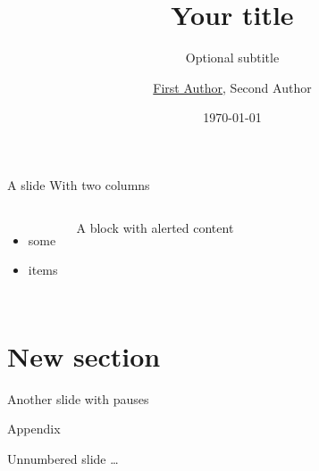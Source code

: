 \documentclass[aspectratio=169]{beamer} %
\title{Your title}
\subtitle{Optional subtitle}
\author{\underline{First Author}, Second Author}
\date{\today}
\institute{Affiliations}
\begin{document}
{\maketitle}

\begin{frame}{A slide}
  With two columns

  \begin{columns}
    \begin{itemize}
      \item some
      \item items
    \end{itemize}

    \begin{block}{A block}
      with \alert{alerted} content
    \end{block}
  \end{columns}
\end{frame}

{\section{New section}}

\begin{frame}{Another slide}
  \centering
  with
  \pause
  pauses
\end{frame}

\appendix

\begin{frame}[standout]
  Appendix
\end{frame}

\begin{frame}{Unnumbered slide}
  \dots
\end{frame}
\end{document}
